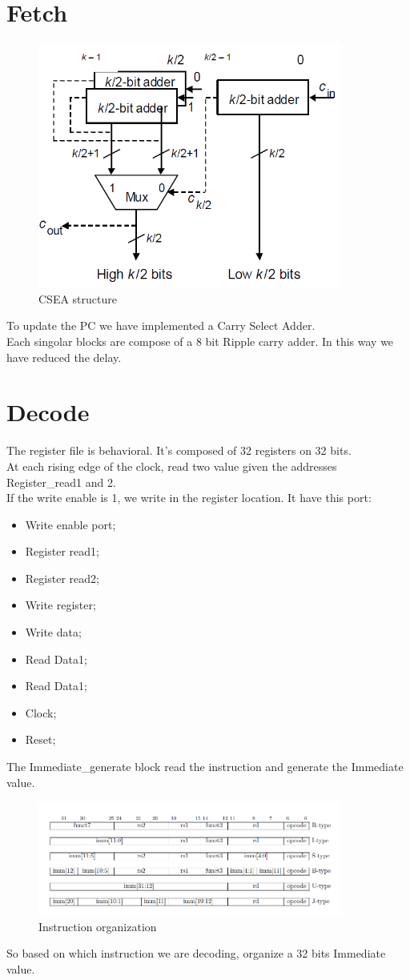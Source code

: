 \section{Fetch}
\begin{figure}[h!]
	\centering
	\includegraphics[width=10cm]{./images/CSEA}
	\caption{CSEA structure}
	\label{fig3}
\end{figure}
To update the PC we have implemented a Carry Select Adder. \\
Each singolar blocks are compose of a 8 bit Ripple carry adder. In this way we have reduced the delay.
\section{Decode}
The register file is behavioral. It's composed of 32 registers on 32 bits. \\
At each rising edge of the clock, read two value given the addresses Register\_read1 and 2.\\
If the write enable is 1, we write in the register location.
It have this port:
\begin{itemize}
	\item Write enable port;
	\item Register read1;
	\item Register read2;
	\item Write register;
	\item Write data;
	\item Read Data1;
	\item Read Data1;
	\item Clock;
	\item Reset;		
\end{itemize}

The Immediate\_generate block read the instruction and generate the Immediate value.
\begin{figure}[h!]
	\centering
	\includegraphics[width=10cm]{./images/immediate_gen}
	\caption{Instruction organization}
	\label{fig4}
\end{figure} 
So based on which instruction we are decoding, organize a 32 bits Immediate value.
